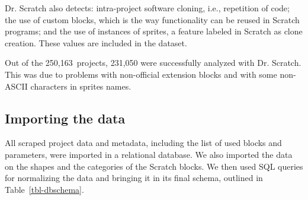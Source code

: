 \documentclass[10pt, conference]{IEEEtran}
\newcommand{\nPrograms}{250,163}
\begin{document}
Dr. Scratch also detects: intra-project software cloning, i.e., repetition of code; the use of custom blocks, which is the way functionality can be reused in Scratch programs; and the use of instances of sprites, a feature labeled in Scratch as clone creation. These values are included in the dataset.

Out of the \nPrograms~projects, 231,050 were successfully analyzed with Dr. Scratch. This was due to problems with non-official extension blocks and with some non-ASCII characters in sprites names.

\subsection{Importing the data}
\label{dataAnalysis}
All scraped project data and metadata, including the list of used blocks and parameters, were imported in a relational database.
We also imported the data on the shapes and the categories of the Scratch blocks.
We then used SQL queries for normalizing the data and bringing it in its final schema, outlined in Table~\ref{tbl-dbschema}.
\end{document}
